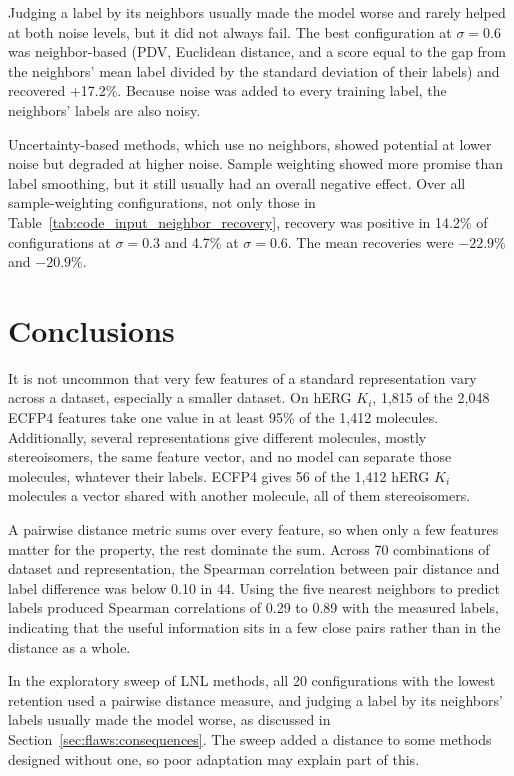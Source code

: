 Judging a label by its neighbors usually made the model worse and rarely helped at both noise levels, but it did not always fail. The best configuration at $\sigma = 0.6$ was neighbor-based (PDV, Euclidean distance, and a score equal to the gap from the neighbors' mean label divided by the standard deviation of their labels) and recovered +17.2\%. Because noise was added to every training label, the neighbors' labels are also noisy. 

Uncertainty-based methods, which use no neighbors, showed potential at lower noise but degraded at higher noise. Sample weighting showed more promise than label smoothing, but it still usually had an overall negative effect. Over all sample-weighting configurations, not only those in Table~\ref{tab:code_input_neighbor_recovery}, recovery was positive in 14.2\% of configurations at $\sigma = 0.3$ and 4.7\% at $\sigma = 0.6$. The mean recoveries were $-22.9\%$ and $-20.9\%$.

\section{Conclusions}

It is not uncommon that very few features of a standard representation vary across a dataset, especially a smaller dataset. On hERG $K_i$, 1,815 of the 2,048 ECFP4 features take one value in at least 95\% of the 1,412 molecules. Additionally, several representations give different molecules, mostly stereoisomers, the same feature vector, and no model can separate those molecules, whatever their labels. ECFP4 gives 56 of the 1,412 hERG $K_i$ molecules a vector shared with another molecule, all of them stereoisomers.

A pairwise distance metric sums over every feature, so when only a few features matter for the property, the rest dominate the sum. Across 70 combinations of dataset and representation, the Spearman correlation between pair distance and label difference was below 0.10 in 44. Using the five nearest neighbors to predict labels produced Spearman correlations of 0.29 to 0.89 with the measured labels, indicating that the useful information sits in a few close pairs rather than in the distance as a whole.

In the exploratory sweep of LNL methods, all 20 configurations with the lowest retention used a pairwise distance measure, and judging a label by its neighbors' labels usually made the model worse, as discussed in Section~\ref{sec:flaws:consequences}. The sweep added a distance to some methods designed without one, so poor adaptation may explain part of this.


